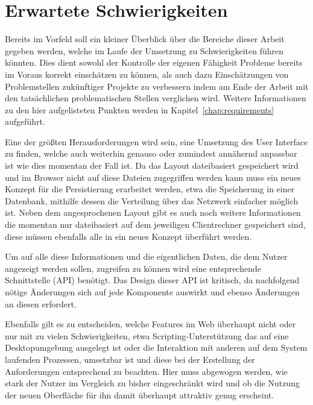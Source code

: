 \section{Erwartete Schwierigkeiten}
Bereits im Vorfeld soll ein kleiner Überblick über die Bereiche dieser Arbeit gegeben werden, welche im Laufe der Umsetzung zu Schwierigkeiten führen könnten. Dies dient sowohl der Kontrolle der eigenen Fähigkeit Probleme bereits im Voraus korrekt einschätzen zu können, als auch dazu Einschätzungen von Problemstellen zukünftiger Projekte zu verbessern indem am Ende der Arbeit mit den tatsächlichen problematischen Stellen verglichen wird. Weitere Informationen zu den hier aufgelisteten Punkten werden in Kapitel~\ref{chap:requirements} aufgeführt.

Eine der größten Herausforderungen wird sein, eine Umsetzung des User Interface zu finden, welche auch weiterhin genauso oder zumindest annähernd anpassbar ist wie dies momentan der Fall ist. Da das Layout dateibasiert gespeichert wird und im Browser nicht auf diese Dateien zugegriffen werden kann muss ein neues Konzept für die Persistierung erarbeitet werden, etwa die Speicherung in einer Datenbank, mithilfe dessen die Verteilung über das Netzwerk einfacher möglich ist. 
Neben dem angesprochenen Layout gibt es auch noch weitere Informationen die momentan nur dateibasiert auf dem jeweiligen Clientrechner gespeichert sind, diese müssen ebenfalls alle in ein neues Konzept überführt werden.

Um auf alle diese Informationen und die eigentlichen Daten, die dem Nutzer angezeigt werden sollen, zugreifen zu können wird eine entsprechende Schnittstelle (API) benötigt. Das Design dieser API ist kritisch, da nachfolgend nötige Änderungen sich auf jede Komponente auswirkt und ebenso Änderungen an diesen erfordert. 

Ebenfalls gilt es zu entscheiden, welche Features im Web überhaupt nicht oder nur mit zu vielen Schwierigkeiten, etwa Scripting-Unterstützung das auf eine Desktopumgebung ausgelegt ist oder die Interaktion mit anderen auf dem System laufenden Prozessen, umsetzbar ist und diese bei der Erstellung der Anforderungen entsprechend zu beachten. Hier muss abgewogen werden, wie stark der Nutzer im Vergleich zu bisher eingeschränkt wird und ob die Nutzung der neuen Oberfläche für ihn damit überhaupt attraktiv genug erscheint.

